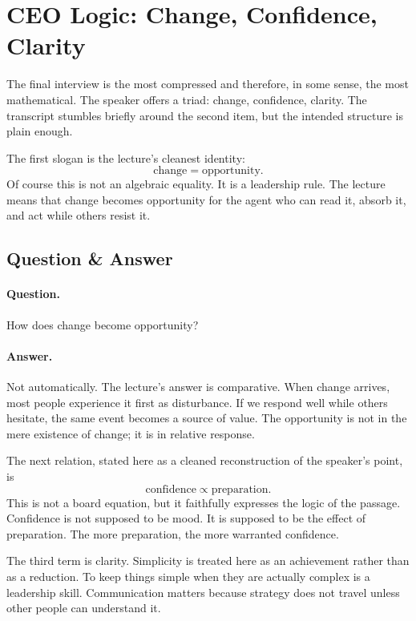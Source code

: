 \section{CEO Logic: Change, Confidence, Clarity}

The final interview is the most compressed and therefore, in some sense, the most mathematical. The speaker offers a triad: change, confidence, clarity. The transcript stumbles briefly around the second item, but the intended structure is plain enough.

The first slogan is the lecture's cleanest identity:
\begin{equation}
\text{change}=\text{opportunity}.
\end{equation}
Of course this is not an algebraic equality. It is a leadership rule. The lecture means that change becomes opportunity for the agent who can read it, absorb it, and act while others resist it.

\subsection{Question \& Answer}

\paragraph{Question.} How does change become opportunity?

\paragraph{Answer.} Not automatically. The lecture's answer is comparative. When change arrives, most people experience it first as disturbance. If we respond well while others hesitate, the same event becomes a source of value. The opportunity is not in the mere existence of change; it is in relative response.

The next relation, stated here as a cleaned reconstruction of the speaker's point, is
\begin{equation}
\text{confidence}\propto \text{preparation}.
\end{equation}
This is not a board equation, but it faithfully expresses the logic of the passage. Confidence is not supposed to be mood. It is supposed to be the effect of preparation. The more preparation, the more warranted confidence.

The third term is clarity. Simplicity is treated here as an achievement rather than as a reduction. To keep things simple when they are actually complex is a leadership skill. Communication matters because strategy does not travel unless other people can understand it.

